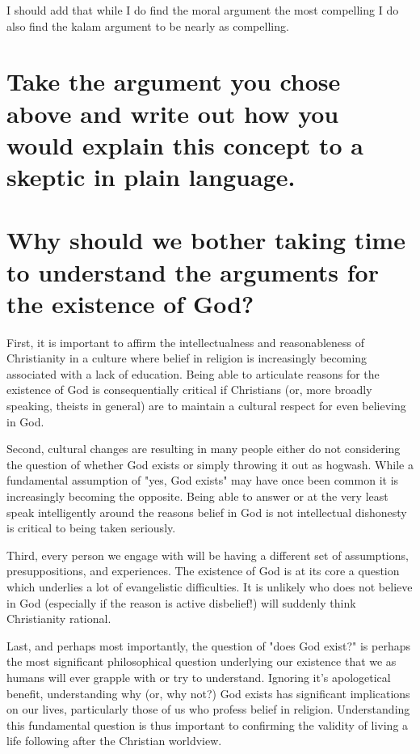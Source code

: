 \documentclass[12pt]{turabian-researchpaper}
\begin{document}
I should add that while I do find the moral argument the most compelling I do also find the kalam argument to be nearly as compelling.

\section{Take the argument you chose above and write out how you would explain this concept to a skeptic in plain language.}


\section{Why should we bother taking time to understand the arguments for the existence of God?}

First, it is important to affirm the intellectualness and reasonableness of Christianity in a culture where belief in religion is increasingly becoming associated with a lack of education. Being able to articulate reasons for the existence of God is consequentially critical if Christians (or, more broadly speaking, theists in general) are to maintain a cultural respect for even believing in God.

Second, cultural changes are resulting in many people either do not considering the question of whether God exists or simply throwing it out as hogwash. While a fundamental assumption of "yes, God exists" may have once been common it is increasingly becoming the opposite. Being able to answer or at the very least speak intelligently around the reasons belief in God is not intellectual dishonesty is critical to being taken seriously.

Third, every person we engage with will be having a different set of assumptions, presuppositions, and experiences. The existence of God is at its core a question which underlies a lot of evangelistic difficulties. It is unlikely who does not believe in God (especially if the reason is active disbelief!) will suddenly think Christianity rational.

Last, and perhaps most importantly, the question of "does God exist?" is perhaps the most significant philosophical question underlying our existence that we as humans will ever grapple with or try to understand. Ignoring it's apologetical benefit, understanding why (or, why not?) God exists has significant implications on our lives, particularly those of us who profess belief in religion. Understanding this fundamental question is thus important to confirming the validity of living a life following after the Christian worldview.
\end{document}
